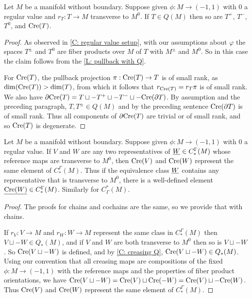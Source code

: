 \begin{corollary}\label{C: creasing Q}
Let $M$ be a manifold without boundary. Suppose given $\phi \colon M \to (-1,1)$ with $0$ a regular value and $r_T:T \to M$ transverse to $M^0$. If $T \in Q(M)$ then so are $T^+$, $T^-$, $T^0$, and $\mathrm{Cre}(T)$.
\end{corollary}
\begin{proof}
As observed in \cref{C: regular value setup}, with our assumptions about $\varphi$ the spaces $T^\pm$ and $T^0$ are fiber products over $M$ of $T$ with $M^\pm$ and $M^0$. So in this case the claim follows from the \cref{L: pullback with Q}.

For $\mathrm{Cre}(T)$, the pullback projection $\pi:\mathrm{Cre}(T) \to T$ is of small rank, as $\dim(\mathrm{Cre}(T))>\dim(T)$, from which it follows that $r_{\mathrm{Cre}(T)} = r_T\pi$ is of small rank. We also have $\partial \mathrm{Cre}(T) = T \sqcup - T^+ \sqcup -T^- \sqcup -\mathrm{Cre}(\partial T)$. By assumption and the preceding paragraph, $T, T^\pm \in Q(M)$ and by the preceding sentence $\mathrm{Cre}(\partial T)$ is of small rank. Thus all components of $\partial \mathrm{Cre}(T)$ are trivial or of small rank, and so $\mathrm{Cre}(T)$ is degenerate.
\end{proof}

\begin{proposition}
Let $M$ be a manifold without boundary. Suppose given $\phi \colon M \to (-1,1)$ with $0$ a regular value. If $V$ and $W$ are any two representatives of $\underline{W} \in C_*^\Gamma(M)$ whose reference maps are transverse to $M^0$, then $\mathrm{Cre}(V)$ and $\mathrm{Cre}(W)$ represent the same element of $C_*^\Gamma(M)$. Thus if the equivalence class $\underline{W}$ contains any representative that is transverse to $M^0$, there is a well-defined element $\underline{\mathrm{Cre}(W)} \in C_*^\Gamma(M)$. Similarly for $C^*_\Gamma(M)$.
\end{proposition}
\begin{proof}
The proofs for chains and cochains are the same, so we provide that with chains.

If $r_V \colon V \to M$ and $r_W \colon W \to M$ represent the same class in $C_*^\Gamma(M)$ then $V \sqcup -W \in Q_*(M)$, and if $V$ and $W$ are both transverse to $M^0$ then so is $V \sqcup -W$. So $\mathrm{Cre}(V\sqcup-W)$ is defined, and by \cref{C: creasing Q}, $\mathrm{Cre}(V \sqcup -W) \in Q_*(M)$. Using our convention that all creasing maps are compositions of the fixed $\phi \colon M \to (-1,1)$ with the reference maps and the properties of fiber product orientations, we have $\mathrm{Cre}(V \sqcup -W) = \mathrm{Cre}(V) \sqcup \mathrm{Cre}(-W) = \mathrm{Cre}(V) \sqcup -\mathrm{Cre}(W)$. Thus $\mathrm{Cre}(V)$ and $\mathrm{Cre}(W)$ represent the same element of $C_*^\Gamma(M)$.
\end{proof}


